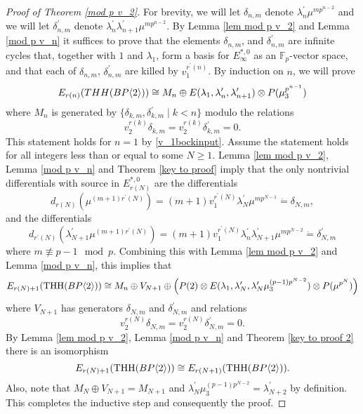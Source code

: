 \begin{proof}[Proof of Theorem \ref{mod p v_2}]
For brevity, we will let $\delta_{n,m}$ denote $\lambda_n^{\prime}\mu^{mp^{n-2}}$ and we will let $\delta_{n,m}^{\prime}$ denote $\lambda_n^{\prime}\lambda_{n+1}^{\prime}\mu^{mp^{n-2}}$.
By Lemma \ref{lem mod p v_2} and Lemma \ref{mod p v_n} it suffices to prove that the elements $\delta_{n,m}$, and $\delta_{n,m}^{\prime}$ are infinite cycles that, together with $1$ and $\lambda_1$, form a basis for $E_{\infty}^{*,0}$ as an $\mathbb{F}_p$-vector space, and that each of $\delta_{n,m}$, $\delta_{n,m}^{\prime}$ are killed by $v_1^{r^{\prime}(n)}$. By induction on $n$, we will prove
\[ E_{r(n)}(THH(BP\langle 2 \rangle))\cong M_n\oplus E(\lambda_1,\lambda_n^{\prime},\lambda_{n+1}^{\prime})\otimes P(\mu_3^{p^{n-1}})\]
where $M_n$ is generated by $\{\delta_{k,m}, \delta_{k,m}^{\prime}\mid k<n\}$ modulo the relations 
\[v_2^{r(k)}\delta_{k,m}=v_2^{r(k)}\delta_{k,m}^{\prime}=0. \]
This statement holds for $n=1$ by \eqref{v_1bockinput}. Assume the statement holds for all integers less than or equal to some $N\ge1$. Lemma \ref{lem mod p v_2}, Lemma \ref{mod p v_n} and Theorem \ref{key to proof} imply that the only nontrivial differentials with source in $E_{r(N)}^{*,0}$ are the differentials
\[ d_{r(N)}(\mu^{(m+1)r^{\prime}(N)})=(m+1)v_1^{r^{\prime}(N)}\lambda_{N}^{\prime}\mu^{mp^{N-1}}\dot{=}\delta_{N,m},\]
and the differentials 
\[ d_{r^{\prime}(N)}(\lambda_{N+1}^{\prime}\mu^{(m+1)r^{\prime}(N)})=(m+1)v_1^{r^{\prime}(N)}\lambda_n^{\prime}\lambda_{N+1}^{\prime}\mu^{mp^{N-2}}\dot{=}\delta_{N,m}^{\prime}\]
where $m\not \equiv p-1 \mod{p}$. Combining this with Lemma \ref{lem mod p v_2} and Lemma \ref{mod p v_n}, this implies that
\[ E_{r(N)+1}(\operatorname{THH}(BP\langle 2 \rangle))\cong M_n\oplus V_{N+1}\oplus \left ( P(2)\otimes E(\lambda_1, \lambda_{N}^{\prime},\lambda_{N}^{\prime}\mu_3^{(p-1)p^{N-2}} )\otimes P(\mu^{p^N})\right )\]
where $V_{N+1}$ has generators $\delta_{N,m}$ and $\delta_{N,m}^{\prime}$ and relations 
\[ v_2^{r(N)}\delta_{N,m}=v_2^{r(N)}\delta_{N,m}^{\prime}=0.\]
By Lemma \ref{lem mod p v_2}, Lemma \ref{mod p v_n} and Theorem \ref{key to proof 2} there is an isomorphism
\[ E_{r(N)+1}(\operatorname{THH}(BP\langle 2 \rangle))\cong E_{r(N+1)}(\operatorname{THH}(BP\langle 2 \rangle)).\] 
Also, note that $M_N\oplus V_{N+1}=M_{N+1}$ and $\lambda_{N}^{\prime}\mu_3^{(p-1)p^{N-2}}=\lambda_{N+2}^{\prime}$ by definition. This completes the inductive step and consequently the proof.
\end{proof}














 